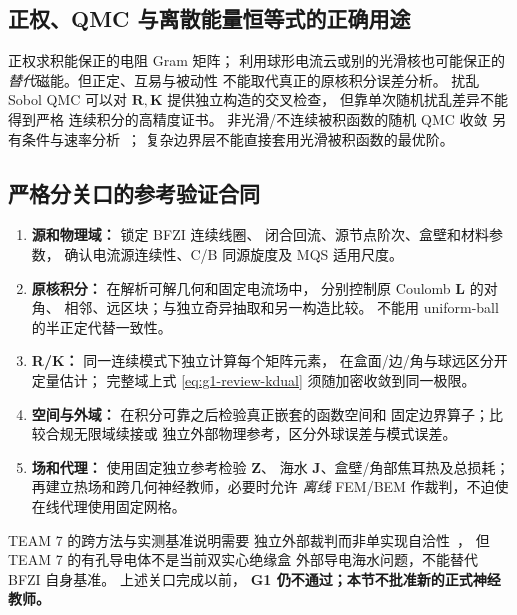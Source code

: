 \subsection{正权、QMC 与离散能量恒等式的正确用途}
正权求积能保正的电阻 Gram 矩阵；
利用球形电流云或别的光滑核也可能保正的
\emph{替代}磁能。但正定、互易与被动性
不能取代真正的原核积分误差分析。
扰乱 Sobol QMC 可以对 $\bm R,\bm K$
提供独立构造的交叉检查，
但靠单次随机扰乱差异不能得到严格
连续积分的高精度证书。
非光滑/不连续被积函数的随机 QMC 收敛
另有条件与速率分析~\cite{hewang2015}；
复杂边界层不能直接套用光滑被积函数的最优阶。

\subsection{严格分关口的参考验证合同}
\begin{enumerate}
\item \textbf{源和物理域：} 锁定 BFZI 连续线圈、
闭合回流、源节点阶次、盒壁和材料参数，
确认电流源连续性、C/B 同源旋度及 MQS 适用尺度。
\item \textbf{原核积分：}
在解析可解几何和固定电流场中，
分别控制原 Coulomb $\bm L$ 的对角、
相邻、远区块；与独立奇异抽取和另一构造比较。
不能用 uniform-ball 的半正定代替一致性。
\item \textbf{R/K：}
同一连续模式下独立计算每个矩阵元素，
在盒面/边/角与球远区分开定量估计；
完整域上式 \eqref{eq:g1-review-kdual}
须随加密收敛到同一极限。
\item \textbf{空间与外域：}
在积分可靠之后检验真正嵌套的函数空间和
固定边界算子；比较合规无限域续接或
独立外部物理参考，区分外球误差与模式误差。
\item \textbf{场和代理：}
使用固定独立参考检验 $\bm Z$、
海水 $\bm J$、盒壁/角部焦耳热及总损耗；
再建立热场和跨几何神经教师，必要时允许
\emph{离线} FEM/BEM 作裁判，不迫使在线代理使用固定网格。
\end{enumerate}

TEAM 7 的跨方法与实测基准说明需要
独立外部裁判而非单实现自洽性~\cite{fujiwara1990team7}，
但 TEAM 7 的有孔导电体不是当前双实心绝缘盒
外部导电海水问题，不能替代 BFZI 自身基准。
上述关口完成以前，
\textbf{G1 仍不通过；本节不批准新的正式神经教师。}
